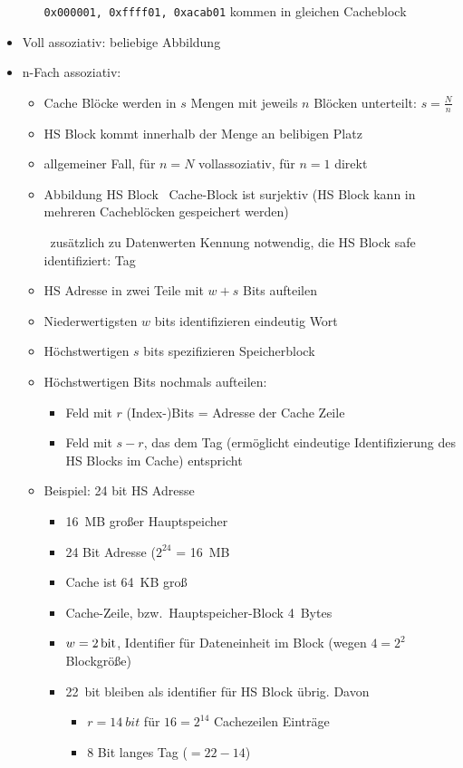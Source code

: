 \begin{itemize}
\begin{itemize}
				\texttt{0x000001, 0xffff01, 0xacab01}  kommen in gleichen Cacheblock
		\end{itemize}
	\item
		Voll assoziativ: beliebige Abbildung
	\item
		n-Fach assoziativ:
		\begin{itemize}
			\item
				Cache Blöcke werden in $s$ Mengen mit jeweils $n$ Blöcken unterteilt: $s = \frac{N}n$
			\item
				HS Block kommt innerhalb der Menge an belibigen Platz
			\item
				allgemeiner Fall, für $n=N$ vollassoziativ, für $n=1$ direkt
			\item
				Abbildung HS Block \ra\ Cache-Block ist surjektiv (HS Block kann in mehreren Cacheblöcken gespeichert werden)

				\Ra\ zusätzlich zu Datenwerten Kennung notwendig, die HS Block safe identifiziert: Tag
			\item
				HS Adresse in zwei Teile mit $w+s$ Bits aufteilen
			\item
				Niederwertigsten $w$ bits identifizieren eindeutig Wort
			\item
				Höchstwertigen $s$ bits spezifizieren Speicherblock
			\item
				Höchstwertigen Bits nochmals aufteilen: 
				\begin{itemize}
					\item
						Feld mit $r$ (Index-)Bits = Adresse der Cache Zeile
					\item
						Feld mit $s-r$, das dem Tag (ermöglicht eindeutige Identifizierung des HS Blocks im Cache) entspricht
				\end{itemize}
			\item
				Beispiel: 24 bit HS Adresse 
				\begin{itemize}
					\item
						\SI{16}{MB} großer Hauptspeicher
					\item
						24 Bit Adresse ($2^{24}$ = \SI{16}{MB}
					\item
						Cache ist \SI{64}{KB} groß
					\item
						Cache-Zeile, bzw.\ Hauptspeicher-Block \SI{4}{Bytes}
					\item
						$w = \SI2{bit}$, Identifier für Dateneinheit im Block (wegen $4=2^2$ Blockgröße)
					\item
						\SI{22}{bit} bleiben als identifier für HS Block übrig. Davon
						\begin{itemize}
							\item
								$r=\SI{14}{bit}$ für $16 = 2^{14}$ Cachezeilen Einträge
							\item
								8 Bit langes Tag ($=22-14$)
						\end{itemize}


\end{itemize}
\end{itemize}
\end{itemize}
